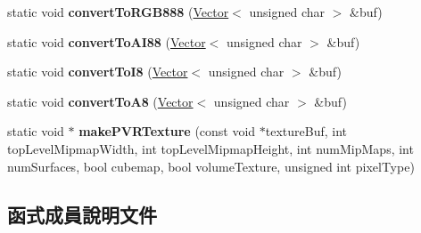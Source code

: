 \begin{DoxyCompactItemize}
\item 
static void {\bfseries convert\+To\+R\+G\+B888} (\hyperlink{class_magnum_1_1_vector}{Vector}$<$ unsigned char $>$ \&buf)\hypertarget{class_magnum_1_1_p_v_r_tex_convert_a3fea0a6e89e672080cba2c2d0ae89012}{}\label{class_magnum_1_1_p_v_r_tex_convert_a3fea0a6e89e672080cba2c2d0ae89012}

\item 
static void {\bfseries convert\+To\+A\+I88} (\hyperlink{class_magnum_1_1_vector}{Vector}$<$ unsigned char $>$ \&buf)\hypertarget{class_magnum_1_1_p_v_r_tex_convert_a4aa57687a7c3d0031ad2e052ba380bc3}{}\label{class_magnum_1_1_p_v_r_tex_convert_a4aa57687a7c3d0031ad2e052ba380bc3}

\item 
static void {\bfseries convert\+To\+I8} (\hyperlink{class_magnum_1_1_vector}{Vector}$<$ unsigned char $>$ \&buf)\hypertarget{class_magnum_1_1_p_v_r_tex_convert_ab0e3228cef9a2bc99835a773c196c8f6}{}\label{class_magnum_1_1_p_v_r_tex_convert_ab0e3228cef9a2bc99835a773c196c8f6}

\item 
static void {\bfseries convert\+To\+A8} (\hyperlink{class_magnum_1_1_vector}{Vector}$<$ unsigned char $>$ \&buf)\hypertarget{class_magnum_1_1_p_v_r_tex_convert_a7c8a1a9e6584d3c6273a2c13eb9db0b4}{}\label{class_magnum_1_1_p_v_r_tex_convert_a7c8a1a9e6584d3c6273a2c13eb9db0b4}

\item 
static void $\ast$ {\bfseries make\+P\+V\+R\+Texture} (const void $\ast$texture\+Buf, int top\+Level\+Mipmap\+Width, int top\+Level\+Mipmap\+Height, int num\+Mip\+Maps, int num\+Surfaces, bool cubemap, bool volume\+Texture, unsigned int pixel\+Type)\hypertarget{class_magnum_1_1_p_v_r_tex_convert_ac71a5d398c5f2cbbd6ad64b3c75dfb5f}{}\label{class_magnum_1_1_p_v_r_tex_convert_ac71a5d398c5f2cbbd6ad64b3c75dfb5f}

\end{DoxyCompactItemize}


\subsection{函式成員說明文件}
